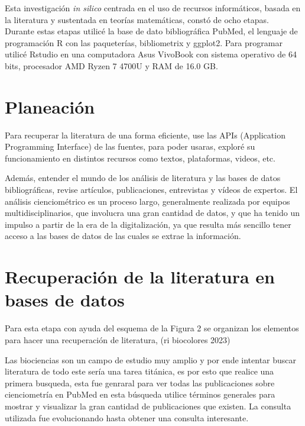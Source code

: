 \documentclass[../Main.tex]{subfiles}
\begin{document}
\noindent
Esta investigación \textit{in silico} centrada en el uso de recursos informáticos, basada en la literatura y sustentada en teorías matemáticas, constó de ocho etapas. \\
Durante estas etapas utilicé la base de dato bibliográfica PubMed, el lenguaje de programación R con las paqueterías, bibliometrix y ggplot2. Para programar utilicé Rstudio en una computadora Asus VivoBook con sistema operativo de 64 bits, procesador AMD Ryzen 7 4700U y RAM de 16.0 GB.
\section{Planeación}

\noindent
Para recuperar la literatura de una forma eficiente, use las APIs (Application Programming Interface) de las fuentes, para poder usaras, exploré su funcionamiento en distintos recursos como textos, plataformas, videos, etc.

\smallskip
Además, entender el mundo de los análisis de literatura y las bases de datos bibliográficas, revise artículos, publicaciones, entrevistas y vídeos de expertos. El análisis cienciométrico es un proceso largo, generalmente realizada por equipos multidisciplinarios, que involucra una gran cantidad de datos, y que ha tenido un impulso a partir de la era de la digitalización, ya que resulta más sencillo tener acceso a las bases de datos de las cuales se extrae la información.

\section{Recuperación de la literatura en bases de datos}
\noindent
Para esta etapa con ayuda del esquema de la Figura 2 se organizan los elementos para hacer una recuperación de literatura,  (ri biocolores 2023)

\smallskip
Las biociencias son un campo de estudio muy amplio y por ende intentar buscar literatura de todo este sería una tarea titánica, es por esto que realice una primera busqueda, esta fue genraral para ver todas las publicaciones sobre cienciometría en PubMed en esta búsqueda utilice términos generales para mostrar y visualizar la gran cantidad de publicaciones que existen. La consulta utilizada fue evolucionando hasta obtener una consulta interesante.\\
\end{document}
